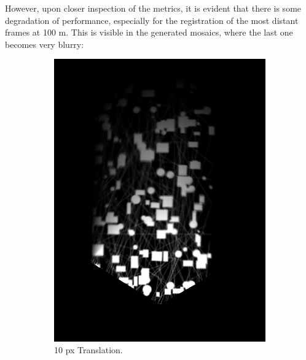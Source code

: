 However, upon closer inspection of the metrics, it is evident that there is some degradation of performance, especially for the registration of the most distant frames at 100 m. This is visible in the generated mosaics, where the last one becomes very blurry:

\begin{figure}[H]
    \centering
    \begin{subfigure}[b]{0.47\textwidth}
        \centering
        \includegraphics[width=\textwidth]{figures/results/Translation-Surge-Combined/FMT-0.png}
        \caption{10 px Translation.}
        \label{sfig:fmt-surge-0}
    \end{subfigure}
    \hfill
    \begin{subfigure}[b]{0.47\textwidth}
        \centering

\end{subfigure}
\end{figure}
